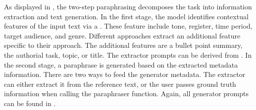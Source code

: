As displayed in , the two-step paraphrasing decomposes the task into information extraction and text generation. 
In the first stage, the model identifies contextual features of the input text via a \pextractor{}.
These feature include tone, register, time period, target audience, and genre.
Different approaches extract an additional feature specific to their approach.
The additional features are a bullet point summary, the authorial task, topic, or title. 
The extractor prompts can be derived from .
In the second stage, a paraphrase is generated based on the extracted metadata information. 
There are two ways to feed the generator metadata.
The extractor can either extract it from the reference text, or the user passes ground truth information when calling the paraphraser function.
Again, all generator prompts can be found in .

